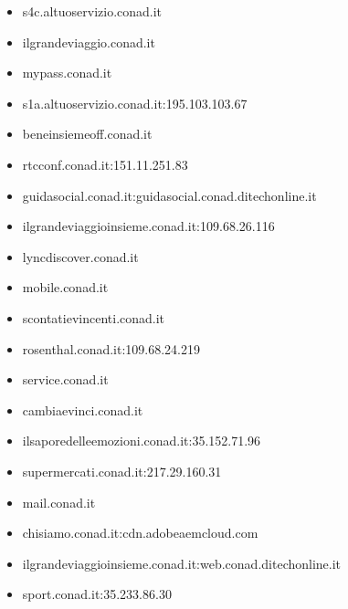 \documentclass{article}
\begin{document}
\begin{itemize}
    
        \item s4c.altuoservizio.conad.it
    
        \item ilgrandeviaggio.conad.it
    
        \item mypass.conad.it
    
        \item s1a.altuoservizio.conad.it:195.103.103.67
    
        \item beneinsiemeoff.conad.it
    
        \item rtcconf.conad.it:151.11.251.83
    
        \item guidasocial.conad.it:guidasocial.conad.ditechonline.it
    
        \item ilgrandeviaggioinsieme.conad.it:109.68.26.116
    
        \item lyncdiscover.conad.it
    
        \item mobile.conad.it
    
        \item scontatievincenti.conad.it
    
        \item rosenthal.conad.it:109.68.24.219
    
        \item service.conad.it
    
        \item cambiaevinci.conad.it
    
        \item ilsaporedelleemozioni.conad.it:35.152.71.96
    
        \item supermercati.conad.it:217.29.160.31
    
        \item mail.conad.it
    
        \item chisiamo.conad.it:cdn.adobeaemcloud.com
    
        \item ilgrandeviaggioinsieme.conad.it:web.conad.ditechonline.it
    
        \item sport.conad.it:35.233.86.30
    

\end{itemize}
\end{document}
